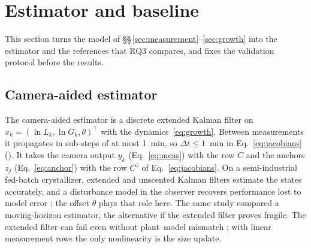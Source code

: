 \section{Estimator and baseline}\label{sec:estimator}

This section turns the model of \S\S\,\ref{sec:measurement}--\ref{sec:growth} into the estimator and the references
that RQ3 compares, and fixes the validation protocol before the results.

\subsection{Camera-aided estimator}\label{sec:ekf}

The camera-aided estimator is a discrete extended Kalman filter on $x_k = (\ln L_k, \ln G_k, \theta)^\top$ with the
dynamics~\eqref{eq:growth}. Between measurements it propagates in sub-steps of at most 1~min, so $\Delta t \le 1$~min
in Eq.~\eqref{eq:jacobians} (). It takes the camera
output $y_k$ (Eq.~\ref{eq:meas}) with the row $C$ and the anchors $z_j$ (Eq.~\ref{eq:anchor}) with the row $C^z$ of
Eq.~\eqref{eq:jacobians}. On a semi-industrial fed-batch crystallizer, extended and unscented Kalman filters estimate
the states accurately, and a disturbance model in the observer recovers performance lost to model error
\citep{Mesbah2011}; the offset $\theta$ plays that role here. The same study compared a moving-horizon estimator, the
alternative if the extended filter proves fragile. The extended filter can fail even without plant--model
mismatch \citep{HaseltineRawlings2005}; with linear measurement rows the only nonlinearity is the size update.

